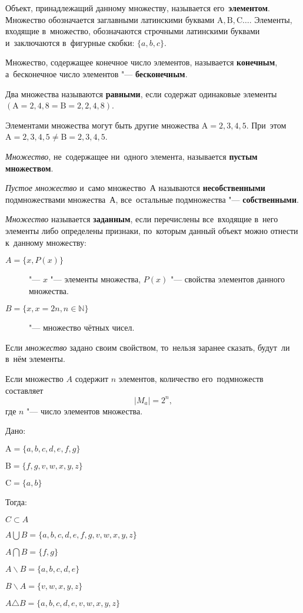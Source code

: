 \documentclass[]{scrartcl}
\begin{document}
Объект, принадлежащий данному множеству, называется его~\textbf{элементом}. Множество обозначается заглавными латинскими буквами ${\text{A}, \text{B}, \text{C}\ldots}$. Элементы, входящие в~множество, обозначаются строчными латинскими буквами и~заключаются в~фигурные скобки: ${\{a,b,c\}}$.

Множество, содержащее конечное число элементов, называется \textbf{конечным}, а~бесконечное число элементов "--- \textbf{бесконечным}.

Два множества называются \textbf{равными}, если содержат одинаковые элементы ${(\text{A}={2,4,8}=\text{B}={2,2,4,8})}$.

Элементами множества могут быть другие множества ${\text{A}={{2,3},{4,5}}}$. При~этом ${\text{A}={{2,3},{4,5}}\neq \text{B}= {2,3,4,5}}$.

\emph{Множество}, не~содержащее ни~одного элемента, называется \textbf{пустым множеством}.

\emph{Пустое множество} и~само множество~$А$ называются \textbf{несобственными} подмножествами множества~$А$, все~остальные подмножества "--- \textbf{собственными}.

\emph{Множество} называется \textbf{заданным}, если перечислены все~входящие в~него элементы либо определены признаки, по~которым данный объект можно отнести к~данному множеству:
\begin{description}
	\item[$A=\{x, P(x)\}$] "--- $x$ "--- элементы множества, $P(x)$ "--- свойства элементов данного множества.
	\item[$B=\{x, x=2n, n \in \mathbb{N}\}$] "--- множество чётных чисел.
\end{description}

Если \emph{множество} задано своим свойством, то~нельзя заранее сказать, будут~ли в~нём элементы.

Если множество $A$ содержит $n$ элементов, количество его~подмножеств составляет
\begin{equation}\label{n-submultitudes}
|M_{a}| = 2^n,
\end{equation}
где $n$ "--- число элементов множества.

\begin{Thexmpl}
	Дано:
	
	$\text{A}={\{a, b, c, d, e, f ,g\}}$
	
	$\text{B}={\{f, g, v, w, x, y, z\}}$
	
	$\text{C}={\{a, b\}}$
	
	Тогда:
	
	$C \subset A$
	
	$A \bigcup B = {\{a, b, c, d, e, f, g, v, w, x, y, z\}}$
	
	$A \bigcap B = {\{f, g\}}$
	
	$A \backslash B = {\{a, b, c, d, e\}}$
	
	$B \backslash A = {\{v, w, x, y, z\}}$
	
	$A \triangle B = {\{a, b, c, d, e, v, w, x, y, z\}}$
\end{Thexmpl}
\end{document}
